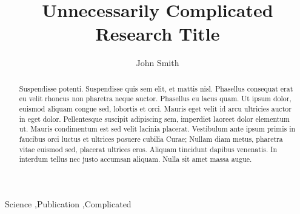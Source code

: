 \documentclass[preprint,12pt,a4paper]{elsarticle}
\begin{document}
\begin{frontmatter}


\title{Unnecessarily Complicated Research Title}




\author{John Smith}

\address{California, United States}

\begin{abstract}
Suspendisse potenti. Suspendisse quis sem elit, et mattis nisl. Phasellus
consequat erat eu velit rhoncus non pharetra neque auctor. Phasellus eu lacus
quam. Ut ipsum dolor, euismod aliquam congue sed, lobortis et orci. Mauris eget
velit id arcu ultricies auctor in eget dolor. Pellentesque suscipit adipiscing
sem, imperdiet laoreet dolor elementum ut. Mauris condimentum est sed velit
lacinia placerat. Vestibulum ante ipsum primis in faucibus orci luctus et
ultrices posuere cubilia Curae; Nullam diam metus, pharetra vitae euismod sed,
placerat ultrices eros. Aliquam tincidunt dapibus venenatis. In interdum tellus
nec justo accumsan aliquam. Nulla sit amet massa augue.
\end{abstract}

\begin{keyword}
Science \sep Publication \sep Complicated


\end{keyword}

\end{frontmatter}
\end{document}
